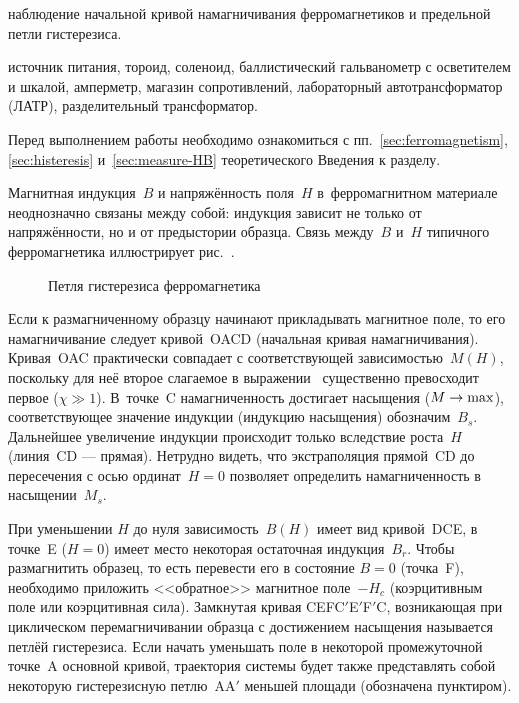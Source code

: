 \label{lab:4-4}

\begin{lab:aim}
	наблюдение начальной кривой намагничивания ферромагнетиков 
    и предельной петли гистерезиса.
\end{lab:aim}

\begin{lab:equipment}
	источник питания, тороид, соленоид, баллистический гальванометр с
осветителем и шкалой,
	амперметр, магазин сопротивлений, лабораторный автотрансформатор (ЛАТР),
разделительный трансформатор.
\end{lab:equipment}


Перед выполнением работы необходимо ознакомиться с
пп.~\ref{sec:ferromagnetism}, \ref{sec:histeresis} и~\ref{sec:measure-HB} 
теоретического Введения к разделу.

Магнитная индукция~${B}$ и напряжённость поля~${H}$
в~ферромагнитном материале неоднозначно связаны между
собой: индукция зависит не только от напряжённости, но и от предыстории образца.
Связь между~$B$ и~$H$ типичного ферромагнетика иллюстрирует
рис.~.

\begin{figure}[h]
    \centering
    \caption{Петля гистерезиса ферромагнетика}
\end{figure}

Если к размагниченному образцу начинают прикладывать магнитное поле,
то его намагничивание следует кривой~OACD (начальная кривая намагничивания).
Кривая~OAC практически совпадает с соответствующей зависимостью~$M(H)$,
поскольку для неё второе слагаемое в выражении~
существенно превосходит первое ($\chi\gg1$). В~точке~C намагниченность
достигает насыщения ($M\to \rm max$), соответствующее значение
индукции (индукцию насыщения) обозначим~$B_s$.
Дальнейшее увеличение индукции происходит только вследствие
роста~$H$ (линия~CD --- прямая). Нетрудно видеть, что экстраполяция прямой~CD 
до пересечения с осью ординат~$H=0$ позволяет определить намагниченность 
в насыщении~$M_s$.

При уменьшении $H$ до нуля зависимость~$B(H)$ имеет вид
кривой~DCE, в точке~E ($H=0$) имеет место некоторая остаточная индукция~$B_r$.
Чтобы размагнитить образец, то есть перевести
его в состояние $B=0$ (точка~F), необходимо приложить <<обратное>> магнитное поле~$-H_c$
(коэрцитивным поле или коэрцитивная сила).
Замкнутая кривая CEFC$'$E$'$F$'$C, возникающая при циклическом перемагничивании
образца с достижением насыщения
называется  петлёй гистерезиса. Если начать уменьшать поле
в некоторой промежуточной точке~A основной кривой, траектория
системы будет также представлять собой некоторую гистерезисную петлю~AA$'$
меньшей площади (обозначена пунктиром).

